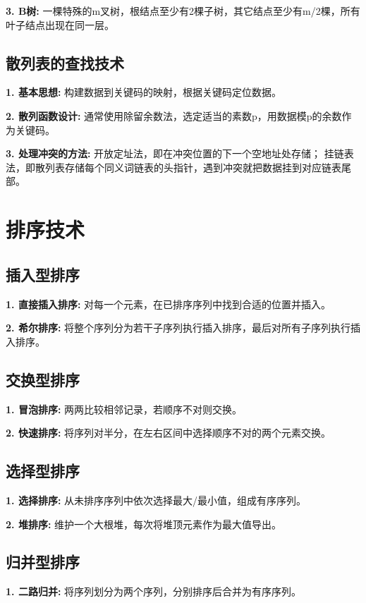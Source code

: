 \textbf{3. B树: }一棵特殊的m叉树，根结点至少有2棵子树，其它结点至少有m/2棵，所有叶子结点出现在同一层。

\subsection{散列表的查找技术}

\textbf{1. 基本思想: }构建数据到关键码的映射，根据关键码定位数据。

\textbf{2. 散列函数设计: }通常使用除留余数法，选定适当的素数p，用数据模p的余数作为关键码。

\textbf{3. 处理冲突的方法: }开放定址法，即在冲突位置的下一个空地址处存储； 挂链表法，即散列表存储每个同义词链表的头指针，遇到冲突就把数据挂到对应链表尾部。

\section{排序技术}

\subsection{插入型排序}

\textbf{1. 直接插入排序: }对每一个元素，在已排序序列中找到合适的位置并插入。

\textbf{2. 希尔排序: }将整个序列分为若干子序列执行插入排序，最后对所有子序列执行插入排序。

\subsection{交换型排序}

\textbf{1. 冒泡排序: }两两比较相邻记录，若顺序不对则交换。

\textbf{2. 快速排序: }将序列对半分，在左右区间中选择顺序不对的两个元素交换。

\subsection{选择型排序}

\textbf{1. 选择排序: }从未排序序列中依次选择最大/最小值，组成有序序列。

\textbf{2. 堆排序: }维护一个大根堆，每次将堆顶元素作为最大值导出。

\subsection{归并型排序}

\textbf{1. 二路归并: }将序列划分为两个序列，分别排序后合并为有序序列。

